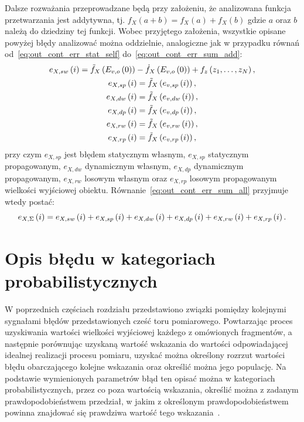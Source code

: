 Dalsze rozważania przeprowadzane będą przy założeniu, że analizowana funkcja przetwarzania jest addytywna, tj. $f_{X}(a + b) = f_{X}(a) + f_{X}(b)$ gdzie $a$ oraz $b$ należą do dziedziny tej funkcji. Wobec przyjętego założenia, wszystkie opisane powyżej błędy analizować można oddzielnie, analogiczne jak w przypadku równań od~\eqref{eq:out_cont_err_stat_self} do~\eqref{eq:out_cont_err_sum_add}:
\begin{gather}
e_{X,sw} \left(i\right) = \tilde{f}_{X} \left( E_{v,o} \left(0\right) \right) - \dot{f}_{X} \left( E_{v,o} \left(0\right) \right) + f_{z} \left( z_{1}, \hdots, z_{N} \right) \label{eq:out_disc_err_stat_self}, \\
e_{X,sp} \left(i\right) = \tilde{f}_{X} \left( e_{v,sp} \left(i\right) \right) \label{eq:out_disc_err_stat_prop}, \\
e_{X,dw} \left(i\right) = \tilde{f}_{X} \left( e_{v,dw} \left(i\right) \right) \label{eq:out_disc_err_dyn_prop}, \\
e_{X,dp} \left(i\right) = \tilde{f}_{X} \left( e_{v,dp} \left(i\right) \right) \label{eq:out_disc_err_dyn_self}, \\
e_{X,rw} \left(i\right) = \tilde{f}_{X} \left( e_{v,rw} \left(i\right) \right) \label{eq:out_disc_err_rand_self}, \\
e_{X,rp} \left(i\right) = \tilde{f}_{X} \left( e_{v,rp} \left(i\right) \right) \label{eq:out_disc_err_rand_prop},
\end{gather}
przy czym $e_{X,sp}$ jest błędem statycznym własnym, $e_{X,sp}$ statycznym propagowanym, $e_{X,dw}$ dynamicznym własnym, $e_{X,dp}$ dynamicznym propagowanym, $e_{X,rw}$ losowym własnym oraz $e_{X,rp}$ losowym propagowanym wielkości wyjściowej obiektu. Równanie~\eqref{eq:out_cont_err_sum_all} przyjmuje wtedy postać:
\begin{equation}
e_{X,\Sigma} \left(i\right) = e_{X,sw} \left(i\right) + e_{X,sp} \left(i\right) + e_{X,dw} \left(i\right) + e_{X,dp} \left(i\right) + e_{X,rw} \left(i\right) + e_{X,rp} \left(i\right) \label{eq:out_disc_err_sum_add}.
\end{equation}

\section{Opis błędu w kategoriach probabilistycznych}

W poprzednich częściach rozdziału przedstawiono związki pomiędzy kolejnymi sygnałami błędów przedstawionych cześć toru pomiarowego. Powtarzając proces uzyskiwania wartości wielkości wyjściowej każdego z omówionych fragmentów, a następnie porównując uzyskaną wartość wskazania do wartości odpowiadającej idealnej realizacji procesu pomiaru, uzyskać można określony rozrzut wartości błędu obarczającego kolejne wskazania oraz określić można jego populację. Na podstawie wymienionych parametrów błąd ten opisać można w kategoriach probabilistycznych, przez co poza wartością wskazania, określić można z zadanym prawdopodobieństwem przedział, w jakim z określonym prawdopodobieństwem powinna znajdować się prawdziwa wartość tego wskazania~\cite{jcgm_guide}.

